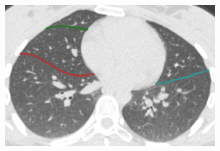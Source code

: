 {\begin{figure}[htbp]
\begin{subfigure}{.32\linewidth}
  \caption{}
  \label{fig:HLASegmentationResults-e} 
\end{subfigure}
\begin{subfigure}{.32\linewidth}%
  \includegraphics[width=\linewidth,trim={{.0\wd0} {.0\wd0} {.0\wd0} {.0\wd0}},clip]{Segmentation/Image/H1335_FRC_PCAFissureDetection_Axial.png}
  \caption{}
  \label{fig:HLASegmentationResults-f} 
\end{subfigure}
\begin{subfigure}{.32\linewidth}%

\end{subfigure}
\end{figure}}
